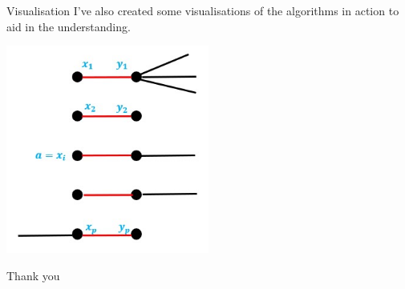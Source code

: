 \documentclass{beamer}
\begin{document}
\begin{frame}{Visualisation}
    I've also created some visualisations of the algorithms in action to aid in the understanding.

    \includegraphics[width=0.5\textwidth]{1-pass}
\end{frame}

\begin{frame}[standout]
    Thank you
\end{frame}
\end{document}
